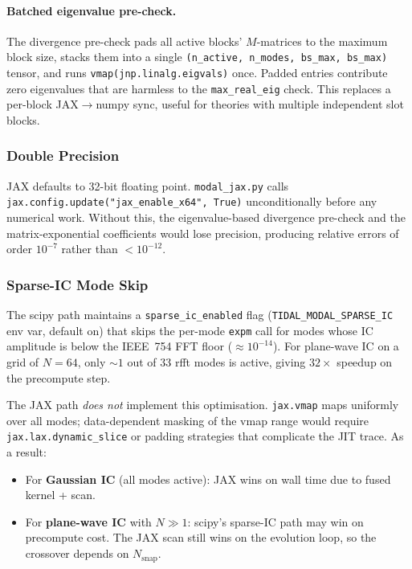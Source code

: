 \paragraph{Batched eigenvalue pre-check.}  The divergence pre-check pads
all active blocks' $M$-matrices to the maximum block size, stacks them
into a single \texttt{(n\_active, n\_modes, bs\_max, bs\_max)} tensor,
and runs \texttt{vmap(jnp.linalg.eigvals)} once.  Padded entries
contribute zero eigenvalues that are harmless to the
\texttt{max\_real\_eig} check.  This replaces a per-block JAX$\to$numpy
sync, useful for theories with multiple independent slot blocks.

\subsubsection{Double Precision}
\label{sec:modal_jax_f64}

JAX defaults to 32-bit floating point.  \texttt{modal\_jax.py} calls
\texttt{jax.config.update("jax\_enable\_x64", True)} unconditionally before
any numerical work.  Without this, the eigenvalue-based divergence pre-check
and the matrix-exponential coefficients would lose precision, producing
relative errors of order $10^{-7}$ rather than $<10^{-12}$.

\subsubsection{Sparse-IC Mode Skip}
\label{sec:modal_jax_sparse_ic}

The scipy path maintains a \texttt{sparse\_ic\_enabled} flag
(\texttt{TIDAL\_MODAL\_SPARSE\_IC} env var, default on) that skips the
per-mode \texttt{expm} call for modes whose IC amplitude is below the
IEEE~754 FFT floor ($\approx10^{-14}$).  For plane-wave IC on a grid of
$N=64$, only $\sim1$ out of $33$ rfft modes is active, giving $32\times$
speedup on the precompute step.

The JAX path \emph{does not} implement this optimisation.  \texttt{jax.vmap}
maps uniformly over all modes; data-dependent masking of the vmap range
would require \texttt{jax.lax.dynamic\_slice} or padding strategies that
complicate the JIT trace.  As a result:

\begin{itemize}
  \item For \textbf{Gaussian IC} (all modes active): JAX wins on wall time
    due to fused kernel + scan.
  \item For \textbf{plane-wave IC} with $N\gg1$: scipy's sparse-IC path may
    win on precompute cost.  The JAX scan still wins on the evolution loop,
    so the crossover depends on $N_{\mathrm{snap}}$.
\end{itemize}

